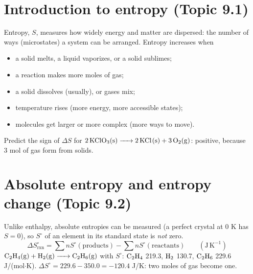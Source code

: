 \documentclass[11pt]{article}
\begin{document}
\titleblock
\begin{abstract}
This guide covers all of Unit 9, Thermodynamics and Electrochemistry, in twelve sections: one for each of Topics 9.1--9.11 in course order (the Fall 2024 course framework, which added Topic 9.6, free energy of dissolution), plus a final section on lab skills and free-response technique. Each section gives the definitions, equations and particle-level reasoning the topic needs, at least one worked example, the phrasing that earns free-response points and the mistakes that cost them. The worked examples use their own reactions and numbers, so none of them give away an item in \emph{Unit 9 Practice Set A} or \emph{Unit 9 Practice Set B}. Plan on about 80 minutes for a full read with a calculator out.
\end{abstract}

\section{Introduction to entropy (Topic 9.1)}\label{t:9.1}
Entropy, $S$, measures how widely energy and matter are dispersed: the number of ways (microstates) a system can be arranged. Entropy increases when
\begin{itemize}
\item a solid melts, a liquid vaporizes, or a solid sublimes;
\item a reaction makes more moles of gas;
\item a solid dissolves (usually), or gases mix;
\item temperature rises (more energy, more accessible states);
\item molecules get larger or more complex (more ways to move).
\end{itemize}
 Predict the sign of $\Delta S$ for $\ce{2KClO3(s) -> 2KCl(s) + 3O2(g)}$: positive, because 3 mol of gas form from solids.

\section{Absolute entropy and entropy change (Topic 9.2)}\label{t:9.2}
Unlike enthalpy, absolute entropies can be measured (a perfect crystal at 0 K has $S = 0$), so $S^\circ$ of an element in its standard state is \emph{not} zero.
\[ \Delta S^\circ_{\text{rxn}} = \sum nS^\circ(\text{products}) - \sum nS^\circ(\text{reactants}) \qquad (\mathrm{J\,K^{-1}}) \]
 $\ce{C2H4(g) + H2(g) -> C2H6(g)}$ with $S^\circ$: $\ce{C2H4}$ 219.3, $\ce{H2}$ 130.7, $\ce{C2H6}$ 229.6 J/(mol$\cdot$K). $\Delta S^\circ = 229.6 - 350.0 = -120.4$ J/K: two moles of gas become one.
\end{document}
